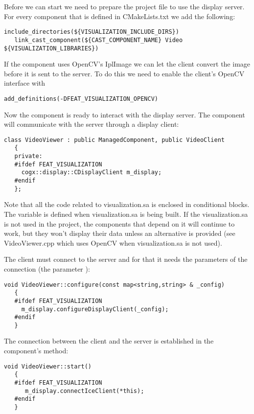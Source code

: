 Before we can start we need to prepare the project file to use the display server.
For every component that is defined in CMakeLists.txt we add the following:

\begin{Verbatim}[fontsize=\scriptsize,gobble=3]
   include_directories(${VISUALIZATION_INCLUDE_DIRS})
   link_cast_component(${CAST_COMPONENT_NAME} Video ${VISUALIZATION_LIBRARIES})
\end{Verbatim}

If the component uses OpenCV's IplImage we can let the client convert the image
before it is sent to the server. To do this we need to enable the client's OpenCV
interface with

\begin{Verbatim}[fontsize=\scriptsize,gobble=3]
   add_definitions(-DFEAT_VISUALIZATION_OPENCV)
\end{Verbatim}

Now the component is ready to interact with the display server. The component
will communicate with the server through a display client:

\begin{Verbatim}[fontsize=\scriptsize,gobble=3]
   class VideoViewer : public ManagedComponent, public VideoClient
   {
   private:
   #ifdef FEAT_VISUALIZATION
     cogx::display::CDisplayClient m_display;
   #endif
   };
\end{Verbatim}

Note that all the code related to visualization.sa is enclosed in conditional
blocks. The variable  is defined when
visualization.sa is being built. If the visualization.sa is not used in the
project, the components that depend on it will continue to work, but they won't
display their data unless an alternative is provided (see VideoViewer.cpp which
uses OpenCV when visualization.sa is not used).

The client must connect to the server and for that it needs the parameters of the
connection (the parameter ):

\begin{Verbatim}[fontsize=\scriptsize,gobble=3]
   void VideoViewer::configure(const map<string,string> & _config)
   {
   #ifdef FEAT_VISUALIZATION
     m_display.configureDisplayClient(_config);
   #endif
   }
\end{Verbatim}

The connection between the client and the server is established in the component's
 method:
\begin{Verbatim}[fontsize=\scriptsize,gobble=3]
   void VideoViewer::start()
   {
   #ifdef FEAT_VISUALIZATION
      m_display.connectIceClient(*this);
   #endif
   }
\end{Verbatim}

